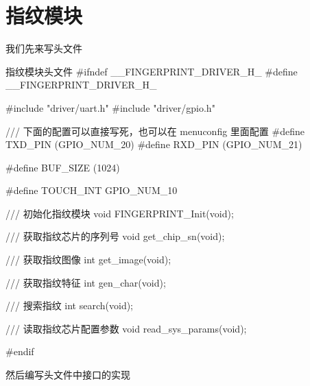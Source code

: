 \documentclass[lang=cn,newtx,10pt,scheme=chinese]{elegantbook}
\begin{document}
\section{指纹模块}

我们先来写头文件

\begin{mycode}{指纹模块头文件}
#ifndef __FINGERPRINT_DRIVER_H_
#define __FINGERPRINT_DRIVER_H_

#include "driver/uart.h"
#include "driver/gpio.h"

/// 下面的配置可以直接写死，也可以在 menuconfig 里面配置
#define TXD_PIN (GPIO_NUM_20)
#define RXD_PIN (GPIO_NUM_21)

#define BUF_SIZE (1024)

#define TOUCH_INT GPIO_NUM_10

/// 初始化指纹模块
void FINGERPRINT_Init(void);

/// 获取指纹芯片的序列号
void get_chip_sn(void);

/// 获取指纹图像
int get_image(void);

/// 获取指纹特征
int gen_char(void);

/// 搜索指纹
int search(void);

/// 读取指纹芯片配置参数
void read_sys_params(void);

#endif
\end{mycode}

然后编写头文件中接口的实现
\end{document}
